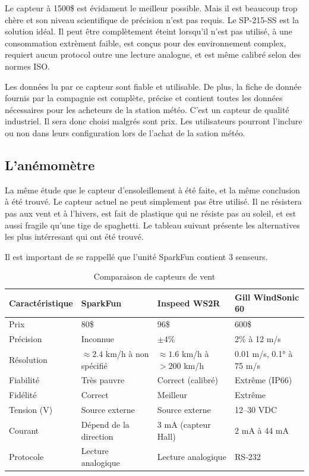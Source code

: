 Le capteur à 1500\$ est évidament le meilleur possible. Mais il est beaucoup trop chère et son niveau scientifique de précision n'est
pas requis. Le SP-215-SS est la solution idéal. Il peut être complètement éteint lorsqu'il n'est pas utilisé, à une consommation extrèment
faible, est conçus pour des environnement complex, requiert aucun protocol outre une lecture analogue, et est même calibré selon des normes ISO.

Les données lu par ce capteur sont fiable et utilisable. De plus, la fiche de donnée fournis par la compagnie est complète, précise et contient
toutes les données nécessaires pour les acheteurs de la station météo. C'est un capteur de qualité industriel. Il sera donc choisi malgrés sont
prix. Les utilisateurs pourront l'inclure ou non dans leurs configuration lors de l'achat de la sation météo.

\subsection{L'anémomètre}
La même étude que le capteur d'ensoleillement à été faite, et la même conclusion à été trouvé.
Le capteur actuel ne peut simplement pas être utilisé. Il ne résistera pas aux vent et à l'hivers, est fait de plastique qui ne résiste pas
au soleil, et est aussi fragile qu'une tige de spaghetti.
Le tableau suivant présente les alternatives les plus intérresant qui ont été trouvé.

Il est important de se rappellé que l'unité SparkFun contient 3 senseurs.

\begin{table}[h]
\centering
\small
\caption{Comparaison de capteurs de vent}
\label{tab:wind_sensors}
\begin{tabular}{llll}
\toprule
\textbf{Caractéristique} & \textbf{SparkFun} & \textbf{Inspeed WS2R} & \textbf{Gill WindSonic 60} \\
\midrule
Prix & 80\$ & 96\$ & 600\$ \\
Précision & Inconnue & $\pm 4\%$ & 2\% à 12 m/s \\
Résolution & $\approx 2.4$ km/h à non spécifié & $\approx 1.6$ km/h à $>200$ km/h & 0.01 m/s, 0.1° à 75 m/s \\
Fiabilité & Très pauvre & Correct (calibré) & Extrême (IP66) \\
Fidélité & Correct & Meilleur & Extrême \\
Tension (V) & Source externe & Source externe & 12--30 VDC \\
Courant & Dépend de la direction & 3 mA (capteur Hall) & 2 mA à 44 mA \\
Protocole & Lecture analogique & Lecture analogique & RS-232 \\
\bottomrule
\end{tabular}
\end{table}


